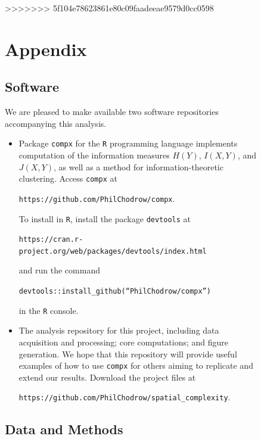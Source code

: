 \documentclass[english]{scrartcl}
\begin{document}
\begin{figure}
{}

>>>>>>> 5f104e78623861e80c09faadeeae9579d0cc0598

\section*{Appendix}
	\subsection*{Software}
		We are pleased to make available two software repositories accompanying this analysis. 
		  \begin{itemize}
		    \item Package \texttt{compx} for the \texttt{R} programming language implements computation of the information measures $H(Y)$, $I(X,Y)$, and $J(X,Y)$, as well as a method for information-theoretic clustering. Access \texttt{compx} at 
		    \begin{displayquote}
		      \texttt{https://github.com/PhilChodrow/compx}. 
		    \end{displayquote}
		    To install in \texttt{R}, install the package \texttt{devtools} at 
		    \begin{displayquote}
		    \texttt{https://cran.r-project.org/web/packages/devtools/index.html}
		    \end{displayquote}
		     and run the command 
		    \begin{displayquote}
		      \texttt{devtools::install\_github(``PhilChodrow/compx'')}
		    \end{displayquote}
		    in the \texttt{R} console. 
		    \item The analysis repository for this project, including data acquisition and processing; core computations; and figure generation. We hope that this repository will provide useful examples of how to use \texttt{compx} for others aiming to replicate and extend our results. Download the project files at 
		    \begin{displayquote}
		      \texttt{https://github.com/PhilChodrow/spatial\_complexity}. 
		    \end{displayquote}
		  \end{itemize}

	\subsection*{Data and Methods}


\end{figure}
\end{document}
